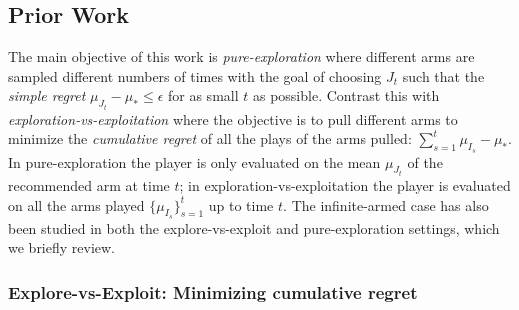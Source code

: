 


\subsection{Prior Work}\label{prior_work}

The main objective of this work is \emph{pure-exploration} where different arms are sampled different numbers of times with the goal of choosing $J_t$ such that the \emph{simple regret} $\mu_{J_t}-\mu_* \leq \epsilon$ for as small $t$ as possible. 
Contrast this with \emph{exploration-vs-exploitation} where the objective is to pull different arms to minimize the \emph{cumulative regret} of all the plays of the arms pulled: $\sum_{s=1}^t \mu_{I_s} - \mu_*$.
In pure-exploration the player is only evaluated on the mean $\mu_{J_t}$ of the recommended arm at time $t$; in exploration-vs-exploitation the player is evaluated on all the arms played $\{ \mu_{I_s} \}_{s=1}^t$ up to time $t$. 
The infinite-armed case has also been studied in both the explore-vs-exploit and pure-exploration settings, which we briefly review. 


\subsubsection{Explore-vs-Exploit: Minimizing cumulative regret} 

